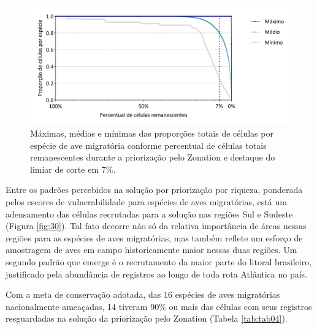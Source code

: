 \documentclass[
  oneside]{scrbook}
\begin{document}
\begin{figure}[H]

{\centering \includegraphics[width=0.85\linewidth]{imagens/cap07/Figura_7.1} 

}

\caption{Máximas, médias e mínimas das proporções totais de células por espécie de ave migratória conforme percentual de células totais remanescentes durante a priorização pelo Zonation e destaque do limiar de corte em 7\%.}\label{fig:21}
\end{figure}



Entre os padrões percebidos na solução por priorização por riqueza, ponderada pelos escores de vulnerabilidade para espécies de aves migratórias, está um adensamento das células recrutadas para a solução nas regiões Sul e Sudeste (Figura \ref{fig:30}). Tal fato decorre não só da relativa importância de áreas nessas regiões para as espécies de aves migratórias, mas também reflete um esforço de amostragem de aves em campo historicamente maior nessas duas regiões. Um segundo padrão que emerge é o recrutamento da maior parte do litoral brasileiro, justificado pela abundância de registros ao longo de toda rota Atlântica no país.

Com a meta de conservação adotada, das 16 espécies de aves migratórias nacionalmente ameaçadas, 14 tiveram 90\% ou mais das células com seus registros resguardadas na solução da priorização pelo Zonation (Tabela \ref{tab:tab04}).

\newpage
\end{document}

